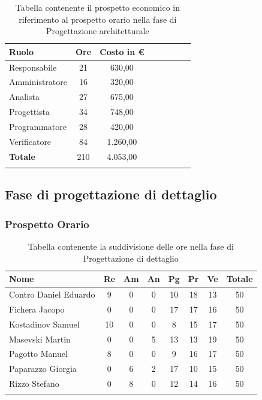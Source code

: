 \documentclass[../piano_di_progetto.tex]{subfiles}
\begin{document}
\begin{center}
	\begin{longtable}{|l|c|c|c|c|c|c|c|}
		\hline
		\rowcolor{lightgray}
		\textbf{Ruolo} & \textbf{Ore} & \textbf{Costo in €}\\

		\hline
		Responsabile & 21 & 630,00\\
		\hline
		Amministratore & 16 & 320,00\\
		\hline
		Analista & 27 & 675,00\\
		\hline
		Progettista & 34 & 748,00\\
		\hline
		Programmatore & 28 & 420,00\\
		\hline
		Verificatore & 84 & 1.260,00\\
		\hline
		\textbf{Totale} & 210 & 4.053,00\\
		\hline
		\rowcolor{white}
		\caption{Tabella contenente il prospetto economico in riferimento al prospetto orario nella fase di Progettazione architetturale}
	\end{longtable}
\end{center}

\subsection{ Fase di progettazione di dettaglio}%
\label{sub:fase_prog_dett}
\subsubsection{Prospetto Orario}

\begin{center}
	\begin{longtable}{|l|c|c|c|c|c|c|c|}
		\hline
		\rowcolor{lightgray}
		\textbf{Nome} & \textbf{Re} & \textbf{Am} & \textbf{An} & \textbf{Pg}  & \textbf{Pr}   & \textbf{Ve} & \textbf{Totale} \\

		\hline
			Contro Daniel Eduardo & 9 & 0 & 0 & 10 & 18 & 13 & 50 \\
		\hline
			Fichera Jacopo & 0 & 0 & 0 & 17 & 17 & 16 & 50 \\
		\hline
			Kostadinov Samuel & 10 & 0 & 0 & 8 & 15 & 17 & 50 \\			
		\hline
			Masevski Martin & 0 & 0 & 5 & 13 & 13 & 19 & 50 \\
		\hline
			Pagotto Manuel & 8 & 0 & 0 & 9 & 16 & 17 & 50 \\		
		\hline
			Paparazzo Giorgia & 0 & 6 & 2 & 17 & 10 & 15 & 50 \\
		\hline
			Rizzo Stefano & 0 & 8 & 0 & 12 & 14 & 16 & 50 \\
		\hline	
		\rowcolor{white}
		\caption{Tabella contenente la suddivisione delle ore nella fase di Progettazione di dettaglio}
	\end{longtable}
\end{center}
\end{document}
